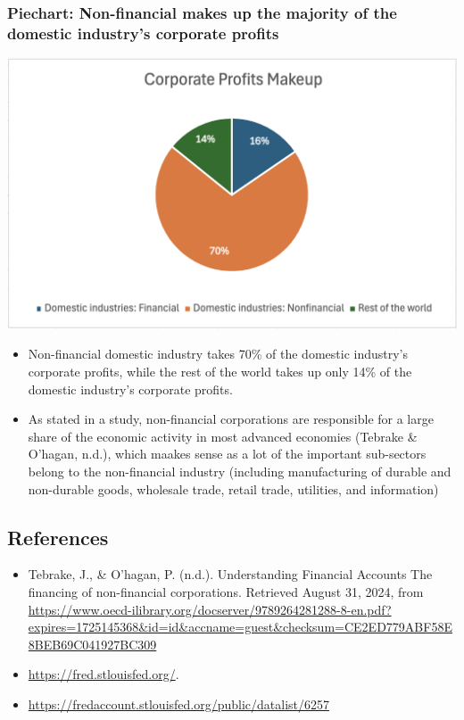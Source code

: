 \documentclass[
  letterpaper,
  DIV=11,
  numbers=noendperiod]{scrreprt}
\providecommand{\tightlist}{%
  \setlength{\itemsep}{0pt}\setlength{\parskip}{0pt}}\usepackage{longtable,booktabs,array}
\begin{document}
\subsubsection{Piechart: Non-financial makes up the majority of the
domestic industry's corporate
profits}\label{piechart-non-financial-makes-up-the-majority-of-the-domestic-industrys-corporate-profits}

\includegraphics{./Excel_1_Unit/Week1_Janice/Week 1/Week 1 Friday/Piechart.png}

\begin{itemize}
\tightlist
\item
  Non-financial domestic industry takes 70\% of the domestic industry's
  corporate profits, while the rest of the world takes up only 14\% of
  the domestic industry's corporate profits.
\item
  As stated in a study, non-financial corporations are responsible for a
  large share of the economic activity in most advanced economies
  (Tebrake \& O'hagan, n.d.), which maakes sense as a lot of the
  important sub-sectors belong to the non-financial industry (including
  manufacturing of durable and non-durable goods, wholesale trade,
  retail trade, utilities, and information)
\end{itemize}

\subsection{References}\label{references}

\begin{itemize}
\item
  Tebrake, J., \& O'hagan, P. (n.d.). Understanding Financial Accounts
  The financing of non-financial corporations. Retrieved August 31,
  2024, from
  \url{https://www.oecd-ilibrary.org/docserver/9789264281288-8-en.pdf?expires=1725145368&id=id&accname=guest&checksum=CE2ED779ABF58E8BEB69C041927BC309}
\item
  \url{https://fred.stlouisfed.org/}.
\item
  \url{https://fredaccount.stlouisfed.org/public/datalist/6257}
\end{itemize}
\end{document}
